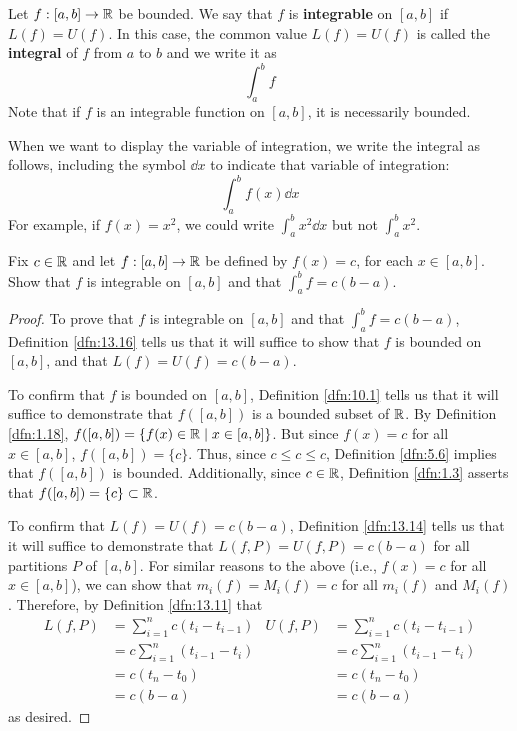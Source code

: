 \documentclass[../main.tex]{subfiles}
\begin{document}
\begin{definition}\label{dfn:13.16}
    Let $f:[a,b]\to\mathbb{R}$ be bounded. We say that $f$ is \textbf{integrable} on $[a,b]$ if $L(f)=U(f)$. In this case, the common value $L(f)=U(f)$ is called the \textbf{integral} of $f$ from $a$ to $b$ and we write it as
    \begin{equation*}
        \int_a^bf
    \end{equation*}
    Note that if $f$ is an integrable function on $[a,b]$, it is necessarily bounded.\par
    When we want to display the variable of integration, we write the integral as follows, including the symbol $\dd{x}$ to indicate that variable of integration:
    \begin{equation*}
        \int_a^bf(x)\dd{x}
    \end{equation*}
    For example, if $f(x)=x^2$, we could write $\int_a^bx^2\dd{x}$ but not $\int_a^bx^2$.
\end{definition}

\begin{exercise}\label{exr:13.17}
    Fix $c\in\mathbb{R}$ and let $f:[a,b]\to\mathbb{R}$ be defined by $f(x)=c$, for each $x\in[a,b]$. Show that $f$ is integrable on $[a,b]$ and that $\int_a^bf=c(b-a)$.
    \begin{proof}
        To prove that $f$ is integrable on $[a,b]$ and that $\int_a^bf=c(b-a)$, Definition \ref{dfn:13.16} tells us that it will suffice to show that $f$ is bounded on $[a,b]$, and that $L(f)=U(f)=c(b-a)$.\par
        To confirm that $f$ is bounded on $[a,b]$, Definition \ref{dfn:10.1} tells us that it will suffice to demonstrate that $f([a,b])$ is a bounded subset of $\mathbb{R}$. By Definition \ref{dfn:1.18}, $f([a,b])=\{f(x)\in\mathbb{R}\mid x\in[a,b]\}$. But since $f(x)=c$ for all $x\in[a,b]$, $f([a,b])=\{c\}$. Thus, since $c\leq c\leq c$, Definition \ref{dfn:5.6} implies that $f([a,b])$ is bounded. Additionally, since $c\in\mathbb{R}$, Definition \ref{dfn:1.3} asserts that $f([a,b])=\{c\}\subset\mathbb{R}$.\par
        To confirm that $L(f)=U(f)=c(b-a)$, Definition \ref{dfn:13.14} tells us that it will suffice to demonstrate that $L(f,P)=U(f,P)=c(b-a)$ for all partitions $P$ of $[a,b]$. For similar reasons to the above (i.e., $f(x)=c$ for all $x\in[a,b]$), we can show that $m_i(f)=M_i(f)=c$ for all $m_i(f)$ and $M_i(f)$. Therefore, by Definition \ref{dfn:13.11} that
        \begin{align*}
            L(f,P) &= \sum_{i=1}^nc(t_i-t_{i-1})&
                U(f,P) &= \sum_{i=1}^nc(t_i-t_{i-1})\\
            &= c\sum_{i=1}^n(t_{i-1}-t_i)&
                &= c\sum_{i=1}^n(t_{i-1}-t_i)\\
            &= c(t_n-t_0)&
                &= c(t_n-t_0)\\
            &= c(b-a)&
                &= c(b-a)
        \end{align*}
        as desired.
    \end{proof}
\end{exercise}
\end{document}
